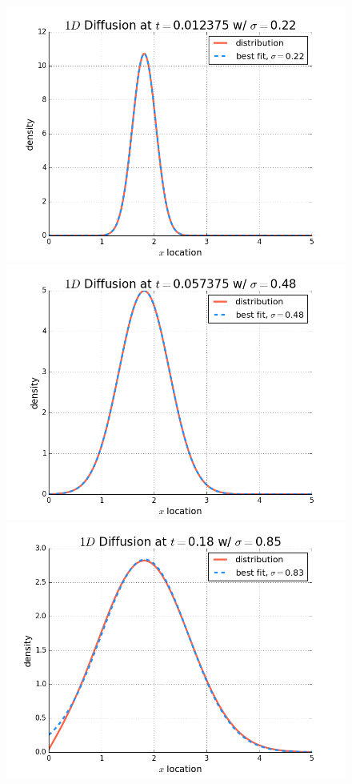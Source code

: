 \documentclass[10pt]{article}
\begin{document}
\begin{figure}[!htb]
  \includegraphics[width=\linewidth]{probdensityt110.png}
  \caption{}\label{fig:probdensity3}
\endminipage\hfill
{}
  \includegraphics[width=\linewidth]{probdensityt510.png}
  \caption{}\label{fig:probdensity4}
\endminipage\hfill
{}
  \includegraphics[width=\linewidth]{probdensityt1600.png}

\end{figure}
\end{document}
